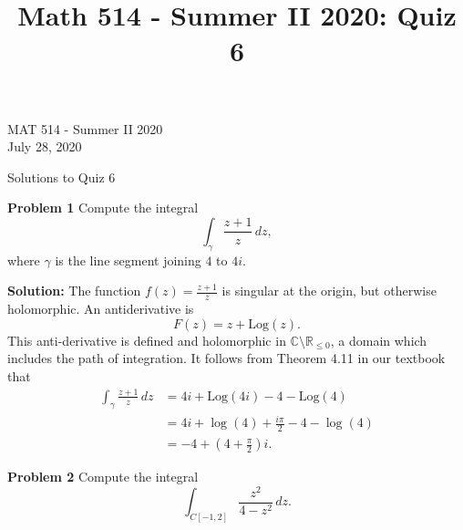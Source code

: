 \documentclass[12pt,oneside]{exam}
\title{Math 514 - Summer II 2020: Quiz 6}
\newenvironment{exercise}[1]{\vspace{.1in}\noindent\textbf{Problem #1 \hspace{.05em}}}{}
\begin{document}
\begin{flushright}
\sc MAT 514 - Summer II 2020\\
July 28, 2020
\end{flushright}
\bigskip
 
\begin{center}
\textsf{Solutions to Quiz 6} 
\end{center}


\begin{exercise}{1}
Compute the integral
\begin{equation*}
\int_{\gamma} \frac{z+1}{z}	\, dz,
\end{equation*}
where $\gamma$ is the line segment joining $4$ to $4i$.
\end{exercise}

\vspace{0.5cm}

\noindent \textbf{Solution:} The function $f(z)=\frac{z+1}{z}$ is singular at the origin, but otherwise holomorphic. An antiderivative is 
\begin{equation*}
F(z) = z + \mathrm{Log}(z).
\end{equation*}
This anti-derivative is defined and holomorphic in $\mathbb{C}\setminus \mathbb{R}_{\leq 0}$, a domain which includes the path of integration. It follows from Theorem 4.11 in our textbook that 
\begin{align*}
\int_{\gamma} \frac{z+1}{z} \, dz & = 4i+\mathrm{Log}(4i)-4-\mathrm{Log}(4) \\
& = 4i+ \log(4)+\frac{i\pi}{2} - 4 -\log(4) \\
& = -4 + \left(4 + \frac{\pi}{2}\right) i.
\end{align*}

\vspace{1cm}

\begin{exercise}{2}
Compute the integral 
\begin{equation*}
\int_{C[-1,2]} \frac{z^2}{4-z^2} \, dz.
\end{equation*}
\end{exercise}

\vspace{0.5cm}
\end{document}
